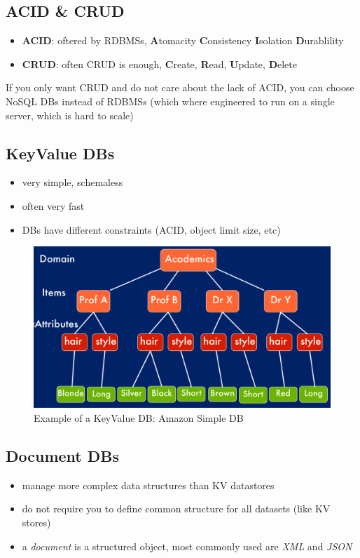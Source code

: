\documentclass[a4paper]{article}
\begin{document}
\begin{multicols}{3}
\subsection{ACID \& CRUD}
\begin{itemize}
    \item \textbf{ACID}: oftered by RDBMSs, \textbf{A}tomacity \textbf{C}onsistency \textbf{I}solation \textbf{D}urablility
    \item \textbf{CRUD}: often CRUD is enough, \textbf{C}reate, \textbf{R}ead, \textbf{U}pdate, \textbf{D}elete
\end{itemize}
If you only want CRUD and do not care about the lack of ACID, you can choose NoSQL DBs instead of RDBMSs (which where engineered to run on a single server, which is hard to scale)

\subsection{KeyValue DBs}
\begin{itemize}
    \item very simple, schemaless
    \item often very fast
    \item DBs have different constraints (ACID, object limit size, etc)
\end{itemize}

\begin{figure}[H]
    \includegraphics[width=\linewidth]{AmazonSimpleDB.png}
    \caption{Example of a KeyValue DB: Amazon Simple DB}
    \label{fig:amazonsimpledb}
\end{figure}

\subsection{Document DBs}
\begin{itemize}
    \item manage more complex data structures than KV datastores
    \item do not require you to define common structure for all datasets (like KV stores)
    \item a \textit{document} is a structured object, most commonly used are \textit{XML} and \textit{JSON}
\end{itemize}


\end{multicols}
\end{document}

